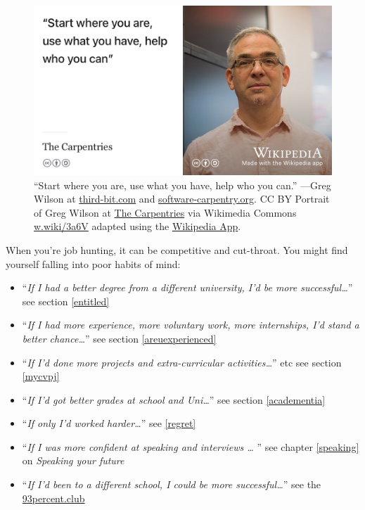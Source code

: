 \documentclass[
]{book}
\providecommand{\tightlist}{%
  \setlength{\itemsep}{0pt}\setlength{\parskip}{0pt}}
\begin{document}
\begin{figure}

{\centering \includegraphics[width=1\linewidth]{images/greg-wilson-software-carpentry} 

}

\caption{``Start where you are, use what you have, help who you can.'' ---Greg Wilson at \href{https://third-bit.com/}{third-bit.com} and \href{https://software-carpentry.org/}{software-carpentry.org}. CC BY Portrait of Greg Wilson at \href{https://en.wikipedia.org/wiki/The_Carpentries}{The Carpentries} via Wikimedia Commons \href{https://w.wiki/3a6V}{w.wiki/3a6V} adapted using the \href{https://apps.apple.com/gb/app/wikipedia/id324715238}{Wikipedia App}.}\label{fig:greg-wilson-fig}
\end{figure}



When you're job hunting, it can be competitive and cut-throat. You might find yourself falling into poor habits of mind:

\begin{itemize}
\tightlist
\item
  ``\emph{If I had a better degree from a different university, I'd be more successful\ldots{}}'' see section \ref{entitled}
\item
  ``\emph{If I had more experience, more voluntary work, more internships, I'd stand a better chance\ldots{}}'' see section \ref{areuexperienced}
\item
  ``\emph{If I'd done more projects and extra-curricular activities\ldots{}}'' etc see section \ref{mycvpj}
\item
  ``\emph{If I'd got better grades at school and Uni\ldots{}}'' see section \ref{academentia}
\item
  ``\emph{If only I'd worked harder\ldots{}}'' see \ref{regret}
\item
  ``\emph{If I was more confident at speaking and interviews \ldots{} }'' see chapter \ref{speaking} on \emph{Speaking your future}
\item
  ``\emph{If I'd been to a different school, I could be more successful\ldots{}}'' see the \href{https://www.93percent.club/}{93percent.club} \citep{93bbc, 93guardian}
\end{itemize}
\end{document}
